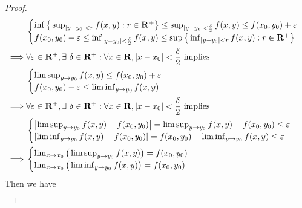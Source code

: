 \begin{proof}
\begin{align*}
                 & \begin{cases}
                       \inf\big\{\sup_{\abs*{y - y_0} < r} f(x, y) : r \in \mathbf{R}^+\big\} \leq \sup_{\abs*{y - y_0} < \frac{\delta}{2}} f(x, y) \leq f(x_0, y_0) + \varepsilon \\
                       f(x_0, y_0) - \varepsilon \leq \inf_{\abs*{y - y_0} < \frac{\delta}{2}} f(x, y) \leq \sup\big\{\inf_{\abs*{y - y_0} < r} f(x, y) : r \in \mathbf{R}^+\big\}
                   \end{cases} \\
        \implies & \forall \varepsilon \in \mathbf{R}^+, \exists\ \delta \in \mathbf{R}^+ : \forall x \in \mathbf{R}, \abs*{x - x_0} < \frac{\delta}{2} \text{ implies}                                 \\
                 & \begin{cases}
                       \limsup_{y \to y_0} f(x, y) \leq f(x_0, y_0) + \varepsilon \\
                       f(x_0, y_0) - \varepsilon \leq \liminf_{y \to y_0} f(x, y)
                   \end{cases}                                                                                                                           \\
        \implies & \forall \varepsilon \in \mathbf{R}^+, \exists\ \delta \in \mathbf{R}^+ : \forall x \in \mathbf{R}, \abs*{x - x_0} < \frac{\delta}{2} \text{ implies}                                 \\
                 & \begin{cases}
                       \abs*{\limsup_{y \to y_0} f(x, y) - f(x_0, y_0)} = \limsup_{y \to y_0} f(x, y) - f(x_0, y_0) \leq \varepsilon \\
                       \abs*{\liminf_{y \to y_0} f(x, y) - f(x_0, y_0)} = f(x_0, y_0) - \liminf_{y \to y_0} f(x, y) \leq \varepsilon
                   \end{cases}                                                                    \\
        \implies & \begin{cases}
                       \lim_{x \to x_0} \big(\limsup_{y \to y_0} f(x, y)\big) = f(x_0, y_0) \\
                       \lim_{x \to x_0} \big(\liminf_{y \to y_0} f(x, y)\big) = f(x_0, y_0)
                   \end{cases}
    \end{align*}
    Then we have
    \begin{align*}

\end{align*}
\end{proof}

